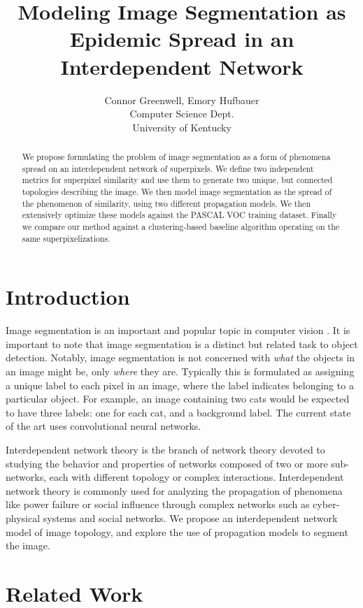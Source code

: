 \documentclass[twocolumn]{article}
\title{Modeling Image Segmentation as Epidemic Spread in an Interdependent Network}
\author{
  Connor Greenwell, Emory Hufbauer\\
  Computer Science Dept. \\
  University of Kentucky
}
\date{}
\newcommand{\seclab}[1]{\label{sec:#1}}
\begin{document}
\maketitle

\begin{abstract}
We propose formulating the problem of image segmentation as a form of phenomena spread on an interdependent network of superpixels. We define two independent metrics for superpixel similarity and use them to generate two unique, but connected topologies describing the image. We then model image segmentation as the spread of the phenomenon of similarity, using two different propagation models. We then extensively optimize these models against the PASCAL VOC training dataset. Finally we compare our method against a clustering-based baseline algorithm operating on the same superpixelizations.
\end{abstract}

\section{Introduction}

Image segmentation is an important and popular topic in computer vision \cite{newell2017associative, li2017fully, ren2017end}. It is important to note that image segmentation is a distinct but related task to object detection. Notably, image segmentation is not concerned with \emph{what} the objects in an image might be, only \emph{where} they are. Typically this is formulated as assigning a unique label to each pixel in an image, where the label indicates belonging to a particular object. For example, an image containing two cats would be expected to have three labels: one for each cat, and a background label. The current state of the art uses convolutional neural networks.

Interdependent network theory is the branch of network theory devoted to studying the behavior and properties of networks composed of two or more sub-networks, each with different topology or complex interactions. Interdependent network theory is commonly used for analyzing the propagation of phenomena like power failure or social influence through complex networks such as cyber-physical systems and social networks. We propose an interdependent network model of image topology, and explore the use of propagation models to segment the image. 

\section{Related Work}\seclab{related}
\end{document}
